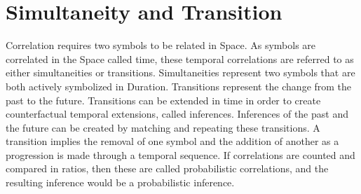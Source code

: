 \section{Simultaneity and Transition}

Correlation requires two symbols to be related in Space.  As symbols
are correlated in the Space called time, these temporal correlations
are referred to as either simultaneities or transitions.
Simultaneities represent two symbols that are both actively symbolized
in Duration.  Transitions represent the change from the past to the
future.  Transitions can be extended in time in order to create
counterfactual temporal extensions, called inferences.  Inferences of
the past and the future can be created by matching and repeating these
transitions.  A transition implies the removal of one symbol and the
addition of another as a progression is made through a temporal
sequence.  If correlations are counted and compared in ratios, then
these are called probabilistic correlations, and the resulting
inference would be a probabilistic inference.

